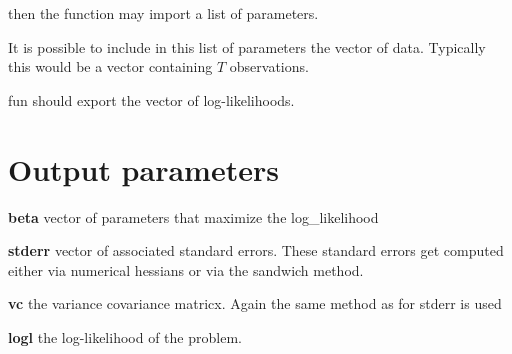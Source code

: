 \documentclass[12pt,a4paper]{article}
\begin{document}
then the function may import a list of parameters. 

It is possible to include in this list of parameters the vector of data.
Typically this would be a vector containing $T$ observations. 

fun should export the vector of log-likelihoods.

\section{Output parameters}

\textbf{beta} vector of parameters that maximize the log\_likelihood

\textbf{stderr} vector of associated standard errors. These standard errors
get computed either via numerical hessians or via the sandwich method.

\textbf{vc} the variance covariance matricx. Again the same method as for
stderr is used 

\textbf{logl} the log-likelihood of the problem.
\end{document}
